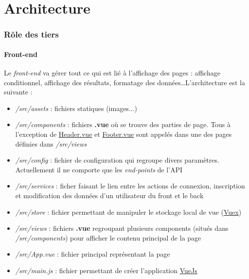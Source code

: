 \part{Architecture}
\section{Rôle des tiers}
\subsection{Front-end}
Le \textit{front-end} va gérer tout ce qui est lié à l'affichage des pages : affichage conditionnel, affichage des résultats, formatage des données\dots L'architecture est la suivante :
\begin{itemize}
	\item \textit{/src/assets} : fichiers statiques (images...)
	\item \textit{/src/components} : fichiers \textbf{.vue} où se trouve des parties de page. Tous à l'exception de \ul{Header.vue} et \ul{Footer.vue} sont appelés dans une des pages définies dans \textit{/src/views}
	\item \textit{/src/config} : fichier de configuration qui regroupe divers paramètres. Actuellement il ne comporte que les \textit{end-points} de l'API
	\item \textit{/src/services} : ficher faisant le lien entre les actions de connexion, inscription et modification des données d'un utilisateur du front et le back
	\item \textit{/src/store} : fichier permettant de manipuler le stockage local de vue (\href{https://vuex.vuejs.org/}{Vuex})
	\item \textit{/src/views} : fichiers \textbf{.vue} regroupant plusieurs components (situés dans \textit{/src/components}) pour afficher le contenu principal de la page
	\item \textit{/src/App.vue} : fichier principal représentant la page
	\item \textit{/src/main.js} : fichier permettant de créer l'application \href{https://vuejs.org/}{VueJs}
\end{itemize}
